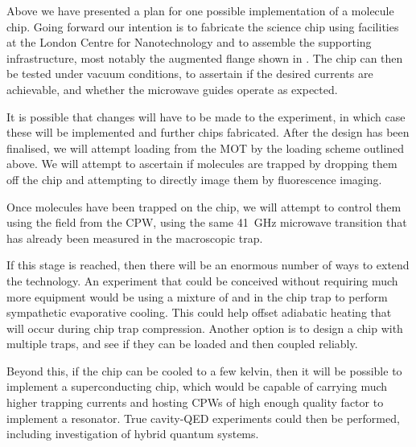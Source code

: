 Above we have presented a plan for one possible implementation of a molecule
chip. Going forward our intention is to fabricate the science chip using
facilities at the London Centre for Nanotechnology and to assemble the supporting
infrastructure, most notably the augmented flange shown in
. The chip can then be tested under vacuum
conditions, to assertain if the desired currents are achievable, and whether
the microwave guides operate as expected. 

It is possible that changes will have to be made to the experiment, in which
case these will be implemented and further chips fabricated. After the design
has been finalised, we will attempt loading from the \CaF{} MOT by the loading
scheme outlined above. We will attempt to ascertain if molecules are trapped by
dropping them off the chip and attempting to directly image them by fluorescence
imaging.

Once molecules have been trapped on the chip, we will attempt to control them
using the field from the CPW, using the same \SI{41}{\giga\hertz} microwave
transition that has already been measured in the macroscopic trap.

If this stage is reached, then there will be an enormous number of ways to
extend the technology. An experiment that could be conceived without requiring
much more equipment would be using a mixture of \esRb{} and \CaF{} in the chip
trap to perform sympathetic evaporative cooling. This could help offset
adiabatic heating that will occur during chip trap compression. Another option
is to design a chip with multiple traps, and see if they can be loaded and then
coupled reliably.

Beyond this, if the chip can be cooled to a few kelvin, then it will be possible
to implement a superconducting chip, which would be capable of carrying much
higher trapping currents and hosting CPWs of high enough quality factor to
implement a resonator. True cavity-QED experiments could then be performed,
including investigation of hybrid quantum systems.
